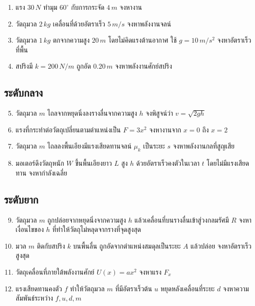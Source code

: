 \begin{enumerate}
    \item แรง $30\,\si{N}$ ทำมุม $60^\circ$ กับการกระจัด $4\,\si{m}$ จงหางาน
    \item วัตถุมวล $2\,\si{kg}$ เคลื่อนที่ด้วยอัตราเร็ว $5\,\si{m/s}$ จงหาพลังงานจลน์
    \item วัตถุมวล $1\,\si{kg}$ ตกจากความสูง $20\,\si{m}$ โดยไม่คิดแรงต้านอากาศ ใช้ $g=10\,\si{m/s^2}$ จงหาอัตราเร็วที่พื้น
    \item สปริงมี $k=200\,\si{N/m}$ ถูกอัด $0.20\,\si{m}$ จงหาพลังงานศักย์สปริง
\end{enumerate}

\subsection*{ระดับกลาง}

\begin{enumerate}
    \setcounter{enumi}{4}
    \item วัตถุมวล $m$ ไถลจากหยุดนิ่งลงรางลื่นจากความสูง $h$ จงพิสูจน์ว่า $v=\sqrt{2gh}$
    \item แรงที่กระทำต่อวัตถุเปลี่ยนตามตำแหน่งเป็น $F=3x^2$ จงหางานจาก $x=0$ ถึง $x=2$
    \item วัตถุมวล $m$ ไถลลงพื้นเอียงมีแรงเสียดทานจลน์ $\mu_k$ เป็นระยะ $s$ จงหาพลังงานกลที่สูญเสีย
    \item มอเตอร์ดึงวัตถุหนัก $W$ ขึ้นพื้นเอียงยาว $L$ สูง $h$ ด้วยอัตราเร็วคงตัวในเวลา $t$ โดยไม่มีแรงเสียดทาน จงหากำลังเฉลี่ย
\end{enumerate}

\subsection*{ระดับยาก}

\begin{enumerate}
    \setcounter{enumi}{8}
    \item วัตถุมวล $m$ ถูกปล่อยจากหยุดนิ่งจากความสูง $h$ แล้วเคลื่อนที่บนรางลื่นเข้าสู่วงกลมรัศมี $R$ จงหาเงื่อนไขของ $h$ ที่ทำให้วัตถุไม่หลุดจากรางที่จุดสูงสุด
    \item มวล $m$ ติดกับสปริง $k$ บนพื้นลื่น ถูกอัดจากตำแหน่งสมดุลเป็นระยะ $A$ แล้วปล่อย จงหาอัตราเร็วสูงสุด
    \item วัตถุเคลื่อนที่ภายใต้พลังงานศักย์ $U(x)=ax^2$ จงหาแรง $F_x$
    \item แรงเสียดทานคงตัว $f$ ทำให้วัตถุมวล $m$ ที่มีอัตราเร็วต้น $u$ หยุดหลังเคลื่อนที่ระยะ $d$ จงหาความสัมพันธ์ระหว่าง $f,u,d,m$
\end{enumerate}


